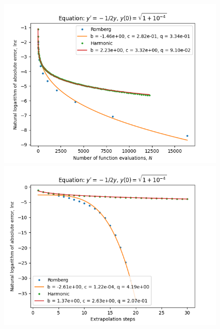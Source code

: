 \begin{figure}[H]
\centering
\begin{minipage}{0.45\textwidth}
\centering
\includegraphics[scale=0.45]{../results/emr_plots/quad_sing_4_hp_trend.png}
\end{minipage}
\begin{minipage}{0.45\textwidth}
\centering
\includegraphics[scale=0.45]{../results/emr_plots/quad_sing_4_hp_steps.png}
\end{minipage}
\end{figure}

